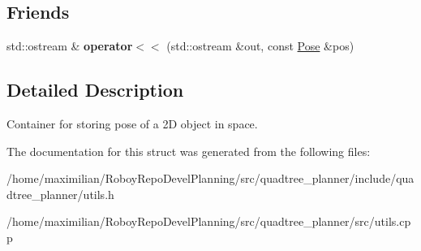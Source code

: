 \subsection*{Friends}
\begin{DoxyCompactItemize}
\item 
\mbox{\label{structquadtree__planner_1_1Pose_a27618b39608d206d837feff803b5b665}} 
std\+::ostream \& {\bfseries operator$<$$<$} (std\+::ostream \&out, const \hyperlink{structquadtree__planner_1_1Pose}{Pose} \&pos)
\end{DoxyCompactItemize}


\subsection{Detailed Description}
Container for storing pose of a 2D object in space. 

The documentation for this struct was generated from the following files\+:\begin{DoxyCompactItemize}
\item 
/home/maximilian/\+Roboy\+Repo\+Devel\+Planning/src/quadtree\+\_\+planner/include/quadtree\+\_\+planner/utils.\+h\item 
/home/maximilian/\+Roboy\+Repo\+Devel\+Planning/src/quadtree\+\_\+planner/src/utils.\+cpp\end{DoxyCompactItemize}
